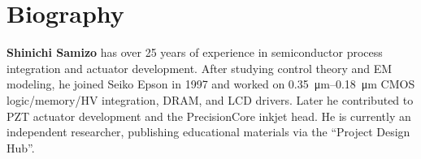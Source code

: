 \documentclass[conference]{IEEEtran}
\begin{document}
\section*{Biography}
\noindent
\textbf{Shinichi Samizo} has over 25 years of experience in semiconductor process integration and actuator development. 
After studying control theory and EM modeling, he joined Seiko Epson in 1997 and worked on \SI{0.35}{\micro m}--\SI{0.18}{\micro m} CMOS logic/memory/HV integration, DRAM, and LCD drivers. 
Later he contributed to PZT actuator development and the PrecisionCore inkjet head. 
He is currently an independent researcher, publishing educational materials via the ``Project Design Hub''.
\end{document}
